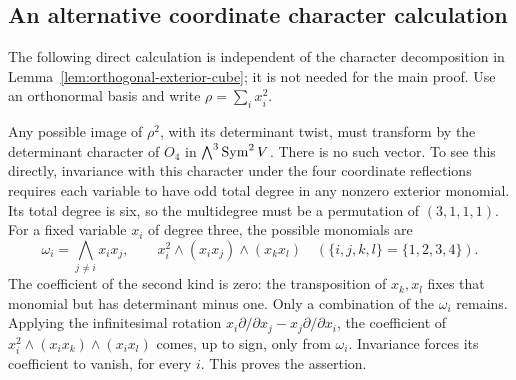 \subsection{An alternative coordinate character calculation}
\label{sec:coordinate-character-alternative}
The following direct calculation is independent of the character decomposition in Lemma~\ref{lem:orthogonal-exterior-cube}; it is not needed for the main proof.
Use an orthonormal basis and write \(\rho=\sum_i x_i^2\).

Any possible image of \(\rho^2\), with its
determinant twist, must transform by the determinant character of
\(O_4\) in \(\bigwedge^3\operatorname{Sym}^2V\).  There is no such vector.
To see this directly, invariance with this character under the four
coordinate reflections requires each variable to have odd total
degree in any nonzero exterior monomial.  Its total degree is six,
so the multidegree must be a permutation of \((3,1,1,1)\).
For a fixed variable \(x_i\) of degree three, the possible
monomials are
\[
 \omega_i=\bigwedge_{j\ne i}x_ix_j,
 \qquad x_i^2\wedge(x_ix_j)\wedge(x_kx_l)
       \quad(\{i,j,k,l\}=\{1,2,3,4\}).
\]
The coefficient of the second kind is zero: the transposition of
\(x_k,x_l\) fixes that monomial but has determinant minus one.
Only a combination of the \(\omega_i\) remains.  Applying the
infinitesimal rotation
\(x_i\partial/\partial x_j-x_j\partial/\partial x_i\),
the coefficient of
\(x_i^2\wedge(x_ix_k)\wedge(x_ix_l)\) comes, up to sign,
only from \(\omega_i\).  Invariance forces its coefficient to
vanish, for every \(i\).  This proves the assertion.

